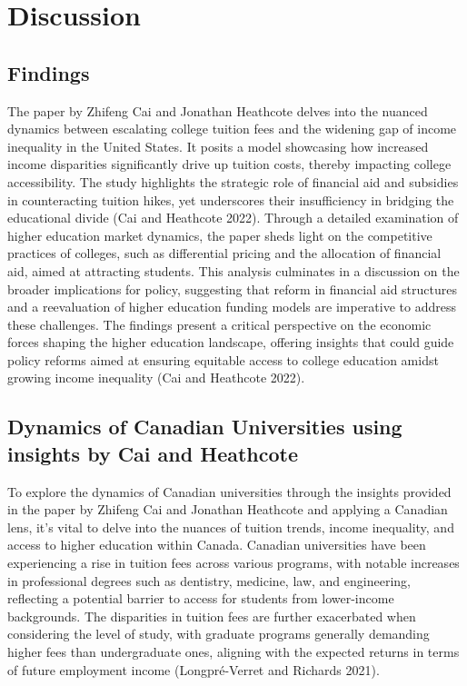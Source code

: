 \documentclass[
  letterpaper,
  DIV=11,
  numbers=noendperiod]{scrartcl}
\begin{document}
\section{Discussion}\label{discussion}

\subsection{Findings}\label{findings}

The paper by Zhifeng Cai and Jonathan Heathcote delves into the nuanced
dynamics between escalating college tuition fees and the widening gap of
income inequality in the United States. It posits a model showcasing how
increased income disparities significantly drive up tuition costs,
thereby impacting college accessibility. The study highlights the
strategic role of financial aid and subsidies in counteracting tuition
hikes, yet underscores their insufficiency in bridging the educational
divide (Cai and Heathcote 2022). Through a detailed examination of
higher education market dynamics, the paper sheds light on the
competitive practices of colleges, such as differential pricing and the
allocation of financial aid, aimed at attracting students. This analysis
culminates in a discussion on the broader implications for policy,
suggesting that reform in financial aid structures and a reevaluation of
higher education funding models are imperative to address these
challenges. The findings present a critical perspective on the economic
forces shaping the higher education landscape, offering insights that
could guide policy reforms aimed at ensuring equitable access to college
education amidst growing income inequality (Cai and Heathcote 2022).

\subsection{Dynamics of Canadian Universities using insights by Cai and
Heathcote}\label{dynamics-of-canadian-universities-using-insights-by-cai-and-heathcote}

To explore the dynamics of Canadian universities through the insights
provided in the paper by Zhifeng Cai and Jonathan Heathcote and applying
a Canadian lens, it's vital to delve into the nuances of tuition trends,
income inequality, and access to higher education within Canada.
Canadian universities have been experiencing a rise in tuition fees
across various programs, with notable increases in professional degrees
such as dentistry, medicine, law, and engineering, reflecting a
potential barrier to access for students from lower-income backgrounds.
The disparities in tuition fees are further exacerbated when considering
the level of study, with graduate programs generally demanding higher
fees than undergraduate ones, aligning with the expected returns in
terms of future employment income (Longpré-Verret and Richards 2021).
\end{document}
